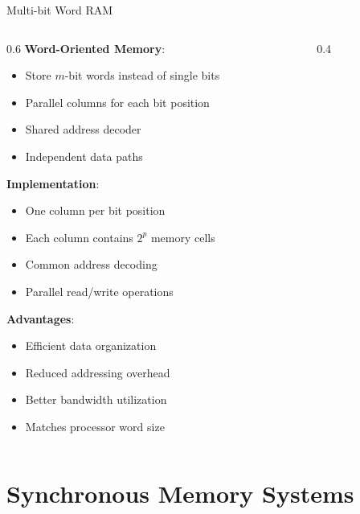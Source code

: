 \documentclass[aspectratio=169,11pt]{beamer}
\newcommand{\concept}[1]{\textbf{\color{accentcolor}#1}}
\begin{document}
\begin{frame}{Multi-bit Word RAM}
\begin{columns}
\begin{column}{0.6\textwidth}
\concept{Word-Oriented Memory}:
\begin{itemize}
\item Store $m$-bit words instead of single bits
\item Parallel columns for each bit position
\item Shared address decoder
\item Independent data paths
\end{itemize}
\vspace{0.3cm}
\concept{Implementation}:
\begin{itemize}
\item One column per bit position
\item Each column contains $2^p$ memory cells
\item Common address decoding
\item Parallel read/write operations
\end{itemize}
\vspace{0.3cm}
\concept{Advantages}:
\begin{itemize}
\item Efficient data organization
\item Reduced addressing overhead
\item Better bandwidth utilization
\item Matches processor word size
\end{itemize}
\end{column}
\begin{column}{0.4\textwidth}
\begin{center}

\end{center}
\end{column}
\end{columns}
\end{frame}

\section{Synchronous Memory Systems}
\end{document}
